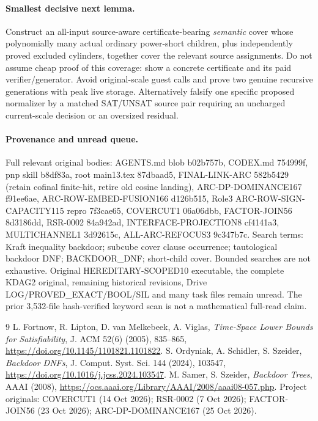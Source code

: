\documentclass[11pt]{article}
\begin{document}
\paragraph{Smallest decisive next lemma.}
Construct an all-input source-aware
certificate-bearing \emph{semantic} cover
whose polynomially many actual ordinary
power-short children, plus independently
proved excluded cylinders, together
cover the relevant source assignments.
Do not assume cheap proof of this
coverage: show a concrete certificate
and its paid verifier/generator.
Avoid original-scale guest calls and
prove two genuine recursive generations
with peak live storage. Alternatively
falsify one specific proposed normalizer
by a matched SAT/UNSAT source pair
requiring an uncharged current-scale
decision or an oversized residual.

\paragraph{Provenance and unread queue.}
Full relevant original bodies: AGENTS.md
blob b02b757b, CODEX.md 754999f,
pnp skill b8df83a, root main13.tex
87dbaad5, FINAL-LINK-ARC 582b5429
(retain cofinal finite-hit, retire
old cosine landing), ARC-DP-DOMINANCE167
f91ee6ae, ARC-ROW-EMBED-FUSION166
d126b515, Role3 ARC-ROW-SIGN-CAPACITY115
repro 7f3cae65, COVERCUT1 06a06dbb,
FACTOR-JOIN56 8d3186dd, RSR-0002
84a942ad, INTERFACE-PROJECTION8
cf4141a3, MULTICHANNEL1 3d92615c,
ALL-ARC-REFOCUS3 9c347b7c.
Search terms: Kraft inequality backdoor;
subcube cover clause occurrence;
tautological backdoor DNF;
BACKDOOR\_DNF; short-child cover.
Bounded searches are not exhaustive.
Original HEREDITARY-SCOPED10 executable,
the complete KDAG2 original,
remaining historical revisions,
Drive LOG/PROVED\_EXACT/BOOL/SIL and
many task files remain unread.
The prior 3,532-file hash-verified
keyword scan is not a mathematical
full-read claim.
\begin{thebibliography}{9}
 L. Fortnow, R. Lipton,
D. van Melkebeek, A. Viglas,
\emph{Time-Space Lower Bounds for Satisfiability},
J. ACM 52(6) (2005), 835--865,
\url{https://doi.org/10.1145/1101821.1101822}.
 S. Ordyniak, A. Schidler,
S. Szeider, \emph{Backdoor DNFs},
J. Comput. Syst. Sci. 144 (2024),
103547,
\url{https://doi.org/10.1016/j.jcss.2024.103547}.
 M. Samer, S. Szeider,
\emph{Backdoor Trees}, AAAI (2008),
\url{https://ocs.aaai.org/Library/AAAI/2008/aaai08-057.php}.
 Project originals:
COVERCUT1 (14 Oct 2026);
RSR-0002 (7 Oct 2026);
FACTOR-JOIN56 (23 Oct 2026);
ARC-DP-DOMINANCE167 (25 Oct 2026).
\end{thebibliography}
\end{document}
